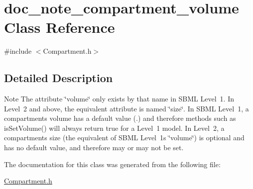 \hypertarget{classdoc__note__compartment__volume}{}\section{doc\+\_\+note\+\_\+compartment\+\_\+volume Class Reference}
\label{classdoc__note__compartment__volume}


{\ttfamily \#include $<$Compartment.\+h$>$}



\subsection{Detailed Description}
\begin{DoxyNote}{Note}
The attribute \char`\"{}volume\char`\"{} only exists by that name in S\+B\+ML Level~1. In Level~2 and above, the equivalent attribute is named \char`\"{}size\char`\"{}. In S\+B\+ML Level~1, a compartment\textquotesingle{}s volume has a default value ({.}) and therefore methods such as is\+Set\+Volume() will always return {\ttfamily true} for a Level~1 model. In Level~2, a compartment\textquotesingle{}s size (the equivalent of S\+B\+ML Level~1\textquotesingle{}s \char`\"{}volume\char`\"{}) is optional and has no default value, and therefore may or may not be set. 
\end{DoxyNote}


The documentation for this class was generated from the following file\+:\begin{DoxyCompactItemize}
\item 
\hyperlink{_compartment_8h}{Compartment.\+h}\end{DoxyCompactItemize}
